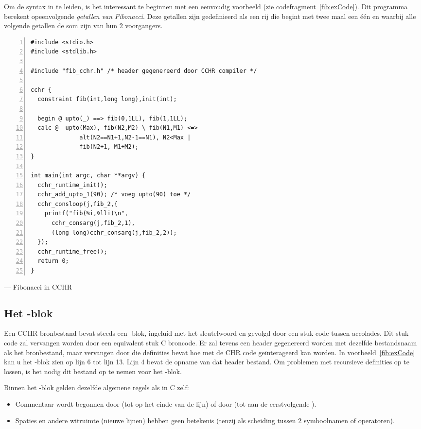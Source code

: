 Om de syntax in te leiden, is het interessant te beginnen met een eenvoudig voorbeeld (zie codefragment~\ref{fib:exCode}). Dit programma berekent opeenvolgende {\em getallen van Fibonacci}. Deze getallen zijn gedefinieerd als een rij die begint met twee maal een \'e\'en en waarbij alle volgende getallen de som zijn van hun 2 voorgangers.

\begin{exCode}
\begin{Verbatim}[frame=single,numbers=left]
#include <stdio.h>
#include <stdlib.h>

#include "fib_cchr.h" /* header gegenereerd door CCHR compiler */

cchr {
  constraint fib(int,long long),init(int);

  begin @ upto(_) ==> fib(0,1LL), fib(1,1LL);
  calc @  upto(Max), fib(N2,M2) \ fib(N1,M1) <=>
              alt(N2==N1+1,N2-1==N1), N2<Max |
              fib(N2+1, M1+M2);
}

int main(int argc, char **argv) {
  cchr_runtime_init();
  cchr_add_upto_1(90); /* voeg upto(90) toe */
  cchr_consloop(j,fib_2,{
    printf("fib(%i,%lli)\n", 
      cchr_consarg(j,fib_2,1),
      (long long)cchr_consarg(j,fib_2,2));
  });
  cchr_runtime_free();
  return 0;
}
\end{Verbatim}
\caption{\label{fib:exCode}  --- Fibonacci in CCHR}
\end{exCode}

\subsection{Het -blok}

Een CCHR bronbestand bevat steeds een -blok, ingeluid met het sleutelwoord  en gevolgd door een stuk code tussen accolades. Dit stuk code zal vervangen worden door een equivalent stuk C broncode. Er zal tevens een header gegenereerd worden met dezelfde bestandsnaam als het bronbestand, maar  vervangen door  die definities bevat hoe met de CHR code ge\"interageerd kan worden. In voorbeeld~\ref{fib:exCode} kan u het -blok zien op lijn 6 tot lijn 13. Lijn 4 bevat de opname van dat header bestand. Om problemen met recursieve definities op te lossen, is het nodig dit bestand op te nemen voor het -blok.

Binnen het -blok gelden dezelfde algemene regels als in C zelf: \begin{itemize}
  \item Commentaar wordt begonnen door \code{//} (tot op het einde van de lijn) of door \code{/*} (tot aan de eerstvolgende \code{*/}).
  \item Spaties en andere witruimte (nieuwe lijnen) hebben geen betekenis (tenzij als scheiding tussen 2 symboolnamen of operatoren).
\end{itemize}


